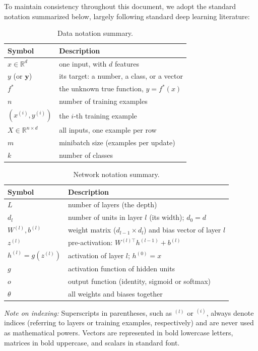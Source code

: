 To maintain consistency throughout this document, we adopt the standard 
notation summarized below, largely following standard deep learning 
literature:
\begin{table}[H]
\centering
\small
\begin{tabular}{ll}
\toprule
\textbf{Symbol} & \textbf{Description} \\
\midrule
$x \in \mathbb{R}^d$ & one input, with $d$ features \\
$y$ (or $\mathbf{y}$) & its target: a number, a class, or a vector \\
$f^*$ & the unknown true function, $y = f^*(x)$ \\
$n$ & number of training examples \\
$(x^{(i)}, y^{(i)})$ & the $i$-th training example \\
$X \in \mathbb{R}^{n \times d}$ & all inputs, one example per row \\
$m$ & minibatch size (examples per update) \\
$k$ & number of classes \\
\bottomrule
\end{tabular}
\caption{Data notation summary.}
\label{tab:data_notation}
\end{table}

\begin{table}[H]
\centering
\small
\begin{tabular}{ll}
\toprule
\textbf{Symbol} & \textbf{Description} \\
\midrule
$L$ & number of layers (the depth) \\
$d_l$ & number of units in layer $l$ (its width); $d_0 = d$ \\
$W^{(l)}, b^{(l)}$ & weight matrix ($d_{l-1} \times d_l$) and bias vector of layer $l$ \\
$z^{(l)}$ & pre-activation: $W^{(l)\top} h^{(l-1)} + b^{(l)}$ \\
$h^{(l)} = g(z^{(l)})$ & activation of layer $l$; $h^{(0)} = x$ \\
$g$ & activation function of hidden units \\
$o$ & output function (identity, sigmoid or softmax) \\
$\theta$ & all weights and biases together \\
\bottomrule
\end{tabular}
\caption{Network notation summary.}
\label{tab:network_notation}
\end{table}

\noindent\textit{Note on indexing:} Superscripts in parentheses, such as 
$^{(l)}$ or $^{(i)}$, always denote indices (referring to layers or training
examples, respectively) and are never used as mathematical powers. 
Vectors are represented in bold lowercase letters, matrices in bold 
uppercase, and scalars in standard font.

